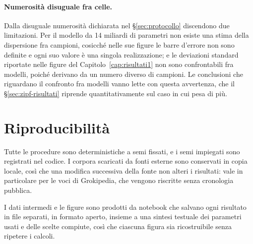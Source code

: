 \paragraph{Numerosità disuguale fra celle.}
Dalla disuguale numerosità dichiarata nel §\ref{sec:protocollo} discendono due
limitazioni. Per il modello da 14 miliardi di parametri non esiste una stima
della dispersione fra campioni, cosicché nelle sue figure le barre d'errore non
sono definite e ogni suo valore è una singola realizzazione; e le deviazioni
standard riportate nelle figure del Capitolo~\ref{cap:risultati1} non sono
confrontabili fra modelli, poiché derivano da un numero diverso di campioni. Le
conclusioni che riguardano il confronto fra modelli vanno lette con questa
avvertenza, che il §\ref{sec:zipf-risultati} riprende quantitativamente sul
caso in cui pesa di più.

\section{Riproducibilità}
\label{sec:riproducibilita}

Tutte le procedure sono deterministiche a semi fissati, e i semi impiegati sono
registrati nel codice. I corpora scaricati da fonti esterne sono conservati in
copia locale, così che una modifica successiva della fonte non alteri i
risultati: vale in particolare per le voci di Grokipedia, che vengono riscritte
senza cronologia pubblica.

I dati intermedi e le figure sono prodotti da notebook che salvano ogni risultato
in file separati, in formato aperto, insieme a una sintesi testuale dei
parametri usati e delle scelte compiute, così che ciascuna figura sia
ricostruibile senza ripetere i calcoli.
